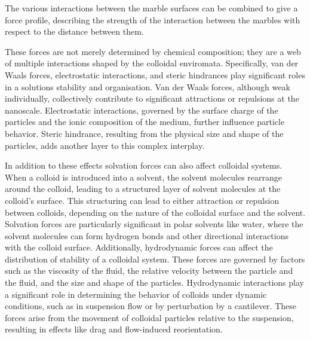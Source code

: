 The various interactions between the marble surfaces can be combined to give a force profile, describing the strength of the interaction between the marbles with respect to the distance between them.\cite{FoundColloidBook}\cite{IsGreenBook}



These forces are not merely determined by chemical composition; they are a web of multiple interactions shaped by the colloidal enviromata. Specifically, van der Waals forces, electrostatic interactions, and steric hindrances play significant roles in a solutions stability and organisation. Van der Waals forces, although weak individually, collectively contribute to significant attractions or repulsions at the nanoscale. Electrostatic interactions, governed by the surface charge of the particles and the ionic composition of the medium, further influence particle behavior. Steric hindrance, resulting from the physical size and shape of the particles, adds another layer to this complex interplay.

In addition to these effects solvation forces can also affect colloidal systems. When a colloid is introduced into a solvent, the solvent molecules rearrange around the colloid, leading to a structured layer of solvent molecules at the colloid's surface. This structuring can lead to either attraction or repulsion between colloids, depending on the nature of the colloidal surface and the solvent. Solvation forces are particularly significant in polar solvents like water, where the solvent molecules can form hydrogen bonds and other directional interactions with the colloid surface. Additionally, hydrodynamic forces can affect the distribution of stability of a colloidal system. These forces are governed by factors such as the viscosity of the fluid, the relative velocity between the particle and the fluid, and the size and shape of the particles. Hydrodynamic interactions play a significant role in determining the behavior of colloids under dynamic conditions, such as in suspension flow or by perturbation by a cantilever. These forces arise from the movement of colloidal particles relative to the suspension, resulting in effects like drag and flow-induced reorientation.

